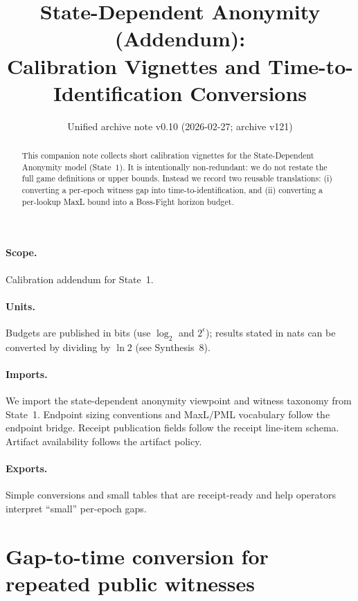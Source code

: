 \documentclass[11pt]{article}
\title{State-Dependent Anonymity (Addendum):\\Calibration Vignettes and Time-to-Identification Conversions}
\author{}
\date{Unified archive note v0.10 (2026-02-27; archive v121)}
\theoremstyle{definition}
\theoremstyle{remark}
\begin{document}
\maketitle

\begin{abstract}
This companion note collects short calibration vignettes for the State-Dependent Anonymity model (State~1).
It is intentionally non-redundant: we do not restate the full game definitions or upper bounds.
Instead we record two reusable translations:
(i) converting a per-epoch witness gap into time-to-identification, and
(ii) converting a per-lookup MaxL bound into a Boss-Fight horizon budget.
\end{abstract}

\paragraph{Scope.}
Calibration addendum for State~1.\cite{series:state1}

\paragraph{Units.} Budgets are published in bits (use $\log_2$ and $2^{\epsilon}$); results stated in nats can be converted by dividing by $\ln 2$ (see Synthesis~8).\cite{series:notation}

\paragraph{Imports.}
We import the state-dependent anonymity viewpoint and witness taxonomy from State~1.\cite{series:state1}
Endpoint sizing conventions and MaxL/PML vocabulary follow the endpoint bridge.\cite{series:endpointbridge}
Receipt publication fields follow the receipt line-item schema.\cite{series:receiptitems}
Artifact availability follows the artifact policy.\cite{series:artifactpolicy}

\paragraph{Exports.}
Simple conversions and small tables that are receipt-ready and help operators interpret ``small'' per-epoch gaps.

\section{Gap-to-time conversion for repeated public witnesses}
\end{document}
